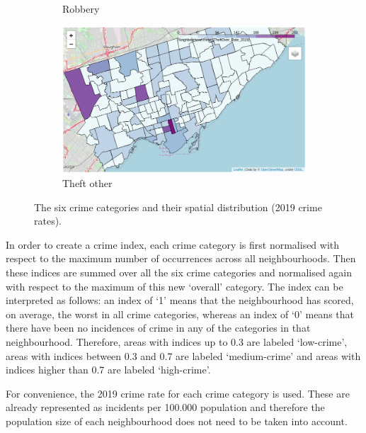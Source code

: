 \documentclass{article}
\begin{document}
\begin{figure}[ht]
\begin{subfigure}[b]{0.47\textwidth}
         \caption{Robbery}
     \end{subfigure}
     \hfill
     \begin{subfigure}[b]{0.47\textwidth}
         \centering
         \includegraphics[width=\textwidth]{pics/theftover}
         \caption{Theft other}
     \end{subfigure}
        \caption{The six crime categories and their spatial distribution (2019 crime rates).}
        \label{fig:nbhcrime}
\end{figure}

In order to create a crime index, each crime category is first normalised with respect to the maximum number of occurrences across all neighbourhoods. Then these indices are summed over all the six crime categories and normalised again with respect to the maximum of this new `overall' category. The index can be interpreted as follows: an index of `1' means that the neighbourhood has scored, on average, the worst in all crime categories, whereas an index of `0' means that there have been no incidences of crime in any of the categories in that neighbourhood. Therefore, areas with indices up to 0.3 are labeled `low-crime', areas with indices between 0.3 and 0.7 are labeled `medium-crime' and areas with indices higher than 0.7 are labeled `high-crime'.

For convenience, the 2019 crime rate for each crime category is used. These are already represented as incidents per 100.000 population and therefore the population size of each neighbourhood does not need to be taken into account.
\end{document}
